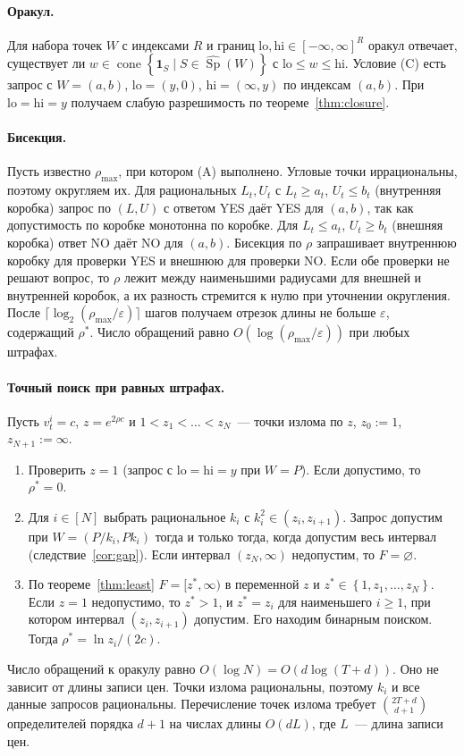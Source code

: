 \documentclass[a4paper,11pt]{article}
\theoremstyle{plain}
\theoremstyle{definition}
\theoremstyle{remark}
\newcommand{\set}[1]{\left\{ #1 \right\}}
\DeclareMathOperator{\cone}{cone}
\DeclareMathOperator{\Sp}{Sp}
\begin{document}
\paragraph{Оракул.} Для набора точек $W$ с индексами $R$ и границ $\mathrm{lo},\mathrm{hi}\in[-\infty,\infty]^R$ оракул отвечает, существует ли $w\in\cone\set{\mathbf 1_S\mid S\in\widehat{\Sp}(W)}$ с $\mathrm{lo}\le w\le\mathrm{hi}$. Условие (C) есть запрос с $W=(a,b)$, $\mathrm{lo}=(y,0)$, $\mathrm{hi}=(\infty,y)$ по индексам $(a,b)$. При $\mathrm{lo}=\mathrm{hi}=y$ получаем слабую разрешимость по теореме~\ref{thm:closure}.

\paragraph{Бисекция.} Пусть известно $\rho_{\max}$, при котором (A) выполнено. Угловые точки иррациональны, поэтому округляем их. Для рациональных $L_t,U_t$ с $L_t\ge a_t$, $U_t\le b_t$ (внутренняя коробка) запрос по $(L,U)$ с ответом YES даёт YES для $(a,b)$, так как допустимость по коробке монотонна по коробке. Для $L_t\le a_t$, $U_t\ge b_t$ (внешняя коробка) ответ NO даёт NO для $(a,b)$. Бисекция по $\rho$ запрашивает внутреннюю коробку для проверки YES и внешнюю для проверки NO. Если обе проверки не решают вопрос, то $\rho$ лежит между наименьшими радиусами для внешней и внутренней коробок, а их разность стремится к нулю при уточнении округления. После $\lceil\log_2(\rho_{\max}/\varepsilon)\rceil$ шагов получаем отрезок длины не больше $\varepsilon$, содержащий $\rho^*$. Число обращений равно $O(\log(\rho_{\max}/\varepsilon))$ при любых штрафах.

\paragraph{Точный поиск при равных штрафах.} Пусть $v^i_t=c$, $z=e^{2\rho c}$ и $1<z_1<\dots<z_N$~--- точки излома по $z$, $z_0:=1$, $z_{N+1}:=\infty$.
\begin{enumerate}
    \item Проверить $z=1$ (запрос с $\mathrm{lo}=\mathrm{hi}=y$ при $W=P$). Если допустимо, то $\rho^*=0$.
    \item Для $i\in[N]$ выбрать рациональное $k_i$ с $k_i^2\in(z_i,z_{i+1})$. Запрос допустим при $W=(P/k_i,Pk_i)$ тогда и только тогда, когда допустим весь интервал (следствие~\ref{cor:gap}). Если интервал $(z_N,\infty)$ недопустим, то $F=\varnothing$.
    \item По теореме~\ref{thm:least} $F=[z^*,\infty)$ в переменной $z$ и $z^*\in\set{1,z_1,\dots,z_N}$. Если $z=1$ недопустимо, то $z^*>1$, и $z^*=z_i$ для наименьшего $i\ge1$, при котором интервал $(z_i,z_{i+1})$ допустим. Его находим бинарным поиском. Тогда $\rho^*=\ln z_i/(2c)$.
\end{enumerate}
Число обращений к оракулу равно $O(\log N)=O(d\log(T+d))$. Оно не зависит от длины записи цен. Точки излома рациональны, поэтому $k_i$ и все данные запросов рациональны. Перечисление точек излома требует $\binom{2T+d}{d+1}$ определителей порядка $d+1$ на числах длины $O(dL)$, где $L$~--- длина записи цен.
\end{document}
